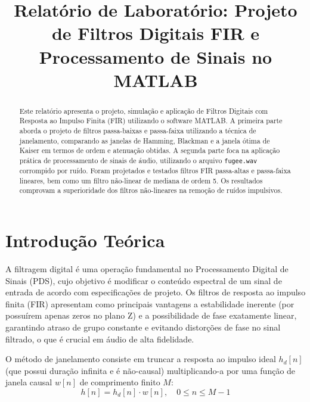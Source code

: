 \documentclass[10pt, conference]{IEEEtran}
\begin{document}
\title{Relatório de Laboratório: Projeto de Filtros Digitais FIR e Processamento de Sinais no MATLAB}

\author{
}

\maketitle

\begin{abstract}
Este relatório apresenta o projeto, simulação e aplicação de Filtros Digitais com Resposta ao Impulso Finita (FIR) utilizando o software MATLAB. A primeira parte aborda o projeto de filtros passa-baixas e passa-faixa utilizando a técnica de janelamento, comparando as janelas de Hamming, Blackman e a janela ótima de Kaiser em termos de ordem e atenuação obtidas. A segunda parte foca na aplicação prática de processamento de sinais de áudio, utilizando o arquivo \texttt{fugee.wav} corrompido por ruído. Foram projetados e testados filtros FIR passa-altas e passa-faixa lineares, bem como um filtro não-linear de mediana de ordem 5. Os resultados comprovam a superioridade dos filtros não-lineares na remoção de ruídos impulsivos.
\end{abstract}

\section{Introdução Teórica}
A filtragem digital é uma operação fundamental no Processamento Digital de Sinais (PDS), cujo objetivo é modificar o conteúdo espectral de um sinal de entrada de acordo com especificações de projeto. Os filtros de resposta ao impulso finita (FIR) apresentam como principais vantagens a estabilidade inerente (por possuírem apenas zeros no plano Z) e a possibilidade de fase exatamente linear, garantindo atraso de grupo constante e evitando distorções de fase no sinal filtrado, o que é crucial em áudio de alta fidelidade.

O método de janelamento consiste em truncar a resposta ao impulso ideal $h_d[n]$ (que possui duração infinita e é não-causal) multiplicando-a por uma função de janela causal $w[n]$ de comprimento finito $M$:
\begin{equation}
h[n] = h_d[n] \cdot w[n], \quad 0 \leq n \leq M-1
\end{equation}
\end{document}

